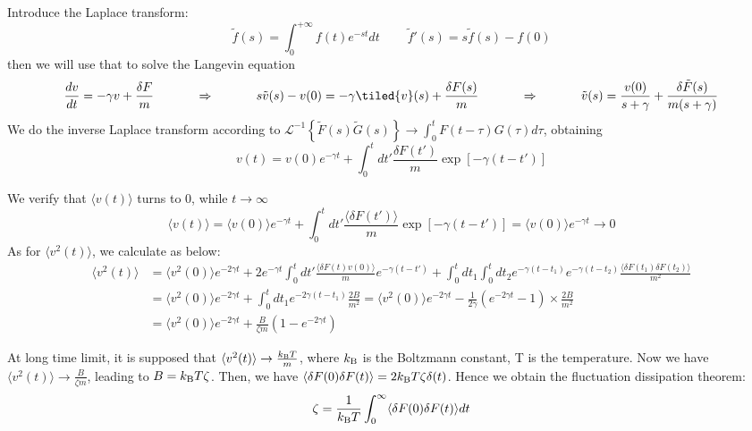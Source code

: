 \documentclass[fleqn,10pt]{InternshipReport_SI-ENS-PSL}
\begin{document}
Introduce the Laplace transform:
$$ \tilde{f}(s) = \int_0^{+\infty} f(t) e^{-st} dt \ \ \ \ \ \ \ \ \ \ \tilde{f}'(s) = s \tilde{f}(s) - f(0) $$
then we will use that to solve the Langevin equation
$$ \frac{dv}{dt} = -\gamma v + \frac{\delta F}{m} \tens \Rightarrow \tens
s\tilde{v}(s) - v(0) = -\gamma \tiled{v}(s) + \frac{\delta F(s)}{m} \tens \Rightarrow \tens
\tilde{v}(s) = \frac{v(0)}{s+\gamma} + \frac{\delta \tilde{F}(s)}{m(s+\gamma)} $$
We do the inverse Laplace transform according to $\mathscr{L}^{-1} \left\{ \tilde{F}(s) \tilde{G}(s) \right\} \to \int_0^t F(t-\tau) G(\tau) d\tau$, obtaining
$$ v(t) = v(0) e^{-\gamma t} + \int_0^t dt' \frac{\delta F(t')}{m} \exp\left[-\gamma(t-t')\right] $$

We verify that $\langle v(t) \rangle$ turns to 0, while $t \to \infty$
$$ \langle v(t) \rangle = \langle v(0) \rangle e^{-\gamma t} + \int_0^t dt' \frac{\langle \delta F(t') \rangle}{m} \exp\left[-\gamma(t-t')\right] = \langle v(0) \rangle e^{-\gamma t} \to 0 $$
As for $\langle v^2(t) \rangle$, we calculate as below:
$$ \begin{align}
\langle v^2(t) \rangle &= \langle v^2(0) \rangle e^{-2\gamma t} + 2 e^{-\gamma t} \int_0^t dt' \frac{\langle \delta F(t) v(0) \rangle}{m} e^{-\gamma (t-t')} + \int_0^t dt_1 \int_0^t dt_2 e^{-\gamma (t-t_1)} e^{-\gamma (t-t_2)} \frac{\langle \delta F(t_1) \delta F(t_2) \rangle}{m^2} \\ %
&= \langle v^2(0) \rangle e^{-2\gamma t} + \int_0^t dt_1 e^{-2\gamma (t-t_1)} \frac{2B}{m^2} = \langle v^2(0) \rangle e^{-2\gamma t} - \frac{1}{2\gamma} (e^{-2\gamma t} - 1) \times \frac{2B}{m^2} \\ %
&= \langle v^2(0) \rangle e^{-2\gamma t} + \frac{B}{\zeta m} (1 - e^{-2\gamma t}) %
\end{align} $$


At long time limit, it is supposed that $\langle v^2 (t) \rangle \to \frac{k_{\mathrm{B}} T}{m}$, where $k_{\mathrm{B}}$ is the Boltzmann constant, T is the temperature. Now we have $\langle v^2 (t) \rangle \to \frac{B}{\zeta m}$, leading to $B = k_{\mathrm{B}} T \zeta$. Then, we have $\langle \delta F(0) \delta F(t) \rangle = 2k_{\mathrm{B}} T \zeta \delta(t)$. Hence we obtain the fluctuation dissipation theorem:
$$ \zeta = \frac{1}{k_{\mathrm{B}} T} \int_0^\infty \langle \delta F(0) \delta F(t) \rangle dt $$
\end{document}
